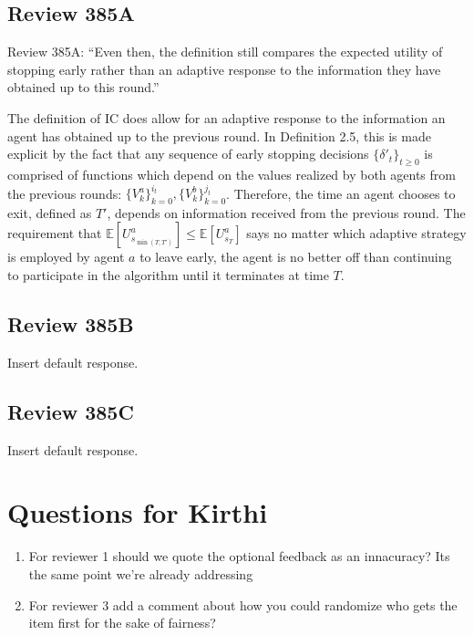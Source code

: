 \documentclass[11pt]{extarticle}
\newcommand{\comment}[1]{\textcolor{red}{(#1)}}
\begin{document}
\subsection*{Review 385A}

Review 385A:
``Even then, the definition still compares the expected utility of stopping early rather than 
an adaptive response to the information they have obtained up to this round.''

\vspace{0.2cm}
\noindent 
The definition of IC does allow for an adaptive response to the information an agent
has obtained up to the previous round.
In Definition 2.5, this is made explicit by the fact that any sequence of early stopping 
decisions
$\{\delta'_t\}_{t\geq 0}$ is comprised of functions which depend on the 
values realized by both agents from the previous rounds:
\(
    \{V^a_k\}_{k=0}^{i_t},
    \{V^b_k\}_{k=0}^{j_t}
\).
Therefore, the time an agent chooses to exit, defined as $T'$, 
depends on information received from
the previous round. 
The requirement that 
\(
    \mathbb{E}\left[
        U^a_{s_{\min(T,T')}}
    \right]
    \leq 
    \mathbb{E}\left[
        U^a_{s_T}
    \right]
\)
says no matter which adaptive strategy is employed by agent $a$
to leave early, the agent is no better off than continuing to participate 
in the algorithm until it terminates at time $T$.

\subsection*{Review 385B}

Insert default response.

\subsection*{Review 385C}

Insert default response.

\section{Questions for Kirthi}

\begin{enumerate}


    \item For reviewer 1 should we quote the optional feedback as an innacuracy?
    Its the same point we're already addressing

    \item For reviewer 3 add a comment about how you could randomize who gets 
    the item first for the sake of fairness?
\end{enumerate}  
\end{document}

